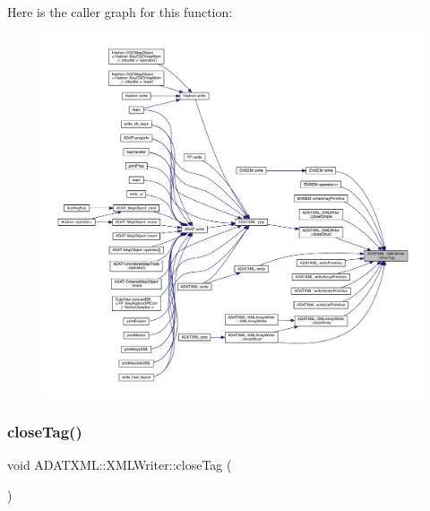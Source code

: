 Here is the caller graph for this function\+:\nopagebreak
\begin{figure}[H]
\begin{center}
\leavevmode
\includegraphics[width=350pt]{da/da7/classADATXML_1_1XMLWriter_a13209ef7863272707bf8fea7c172e9f1_icgraph}
\end{center}
\end{figure}
\mbox{\label{classADATXML_1_1XMLWriter_a13209ef7863272707bf8fea7c172e9f1}} 
\subsubsection{\texorpdfstring{closeTag()}{closeTag()}\hspace{0.1cm}{\footnotesize\ttfamily [2/2]}}
{\footnotesize\ttfamily void A\+D\+A\+T\+X\+M\+L\+::\+X\+M\+L\+Writer\+::close\+Tag (\begin{DoxyParamCaption}{ }\end{DoxyParamCaption})}

\mbox{\label{classADATXML_1_1XMLWriter_a7749a56b9e15992d3168f808b2ad02c5}} 
